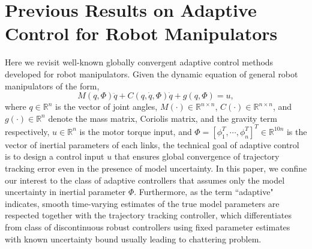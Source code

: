 \documentclass[Afour,sageh,times]{sagej}
\begin{document}
\section{Previous Results on Adaptive Control for Robot Manipulators}
Here we revisit well-known globally convergent adaptive control methods developed for robot manipulators. Given the dynamic equation of general robot manipulators of the form,
\begin{equation}
M(q,\Phi)\ddot{q}+C(q,\dot{q},\Phi)\dot{q} + g(q,\Phi) = u, \label{dynamics}
\end{equation}
where $q\in\mathbb{R}^n$ is the vector of joint angles, $M(\cdot)\in\mathbb{R}^{n\times n}$, $C(\cdot)\in\mathbb{R}^{n\times n}$, and $g(\cdot)\in\mathbb{R}^{n}$ denote the mass matrix, Coriolis matrix, and the gravity term respectively, $u\in\mathbb{R}^{n}$ is the motor torque input, and $\Phi = [\phi_{1}^{T}, \cdots, \phi_{n}^{T}]^{T}\in\mathbb{R}^{10n}$ is the vector of inertial parameters of each links, the technical goal of adaptive control is to design a control input $u$ that ensures global convergence of trajectory tracking error even in the presence of model uncertainty. In this paper, we confine our interest to the class of adaptive controllers that assumes only the model uncertainty in inertial parameter $\Phi$. Furthermore, as the term ``adaptive"  indicates, smooth time-varying estimates of the true model parameters are respected together with the trajectory tracking controller, which differentiates from class of discontinuous robust controllers using fixed parameter estimates with known uncertainty bound usually leading to chattering problem.
\end{document}

